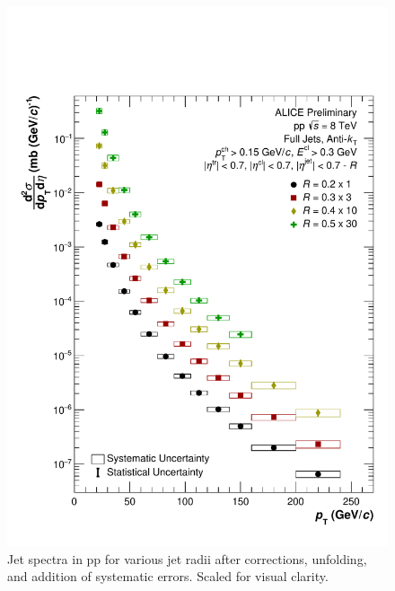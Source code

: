 \documentclass[ALICE]{ALICE_analysis_notes}
\newcommand{\pp}{pp\xspace}
\begin{document}
\begin{figure}
    \centering
    \includegraphics[width=15cm]{figures/FinalResults/Bayes_reg6.pdf}
    \caption{Jet spectra in \pp for various jet radii after corrections, unfolding, and addition of systematic errors. Scaled for visual clarity.}
    \label{fig:finalSpectra}
\end{figure}
\end{document}

